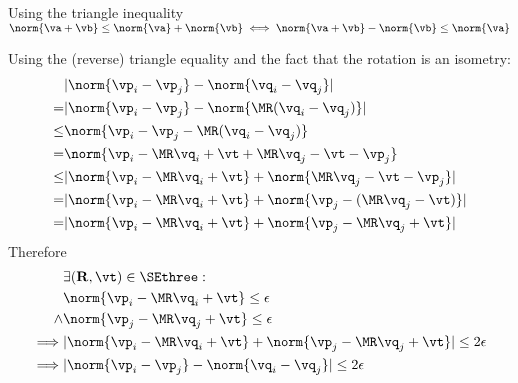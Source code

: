  
    Using the triangle inequality $\norm{\va + \vb} \leq \norm{\va} + \norm{\vb} \iff \norm{\va + \vb} - \norm{\vb} \leq \norm{\va}$
    
    Using the (reverse) triangle equality and the fact that the rotation is an isometry:
    \begin{equation}
		\begin{aligned}
             &| \norm{\vp_i - \vp_j} - \norm{\vq_i - \vq_j} |\\
             =&| \norm{\vp_i - \vp_j} - \norm{\MR(\vq_i - \vq_j)} |\\
             \leq & \norm{ \vp_i - \vp_j - \MR (\vq_i - \vq_j)} \\
             =&\norm{ \vp_i - \MR \vq_i + \vt + \MR \vq_j - \vt - \vp_j} \\
             \leq &| \norm{\vp_i - \MR \vq_i + \vt} + \norm{\MR \vq_j - \vt - \vp_j} |\\
             =  &| \norm{\vp_i - \MR \vq_i + \vt} + \norm{\vp_j - (\MR \vq_j - \vt)} |\\
             =   &| \norm{\vp_i - \MR \vq_i + \vt} + \norm{\vp_j - \MR \vq_j + \vt} |\\
            \end{aligned}
	\end{equation}
 Therefore 
    \begin{equation}
		\begin{aligned}
         &\exists (\mathbf{R}, \vt) \in \SEthree:\\
            &\norm{\vp_i - \MR \vq_i + \vt} \leq \epsilon\\
            \land &\norm{\vp_j - \MR \vq_j + \vt} \leq \epsilon\\
        \implies & | \norm{\vp_i - \MR \vq_i + \vt} + \norm{\vp_j - \MR \vq_j + \vt} | \leq 2 \epsilon \\
        \implies & | \norm{\vp_i - \vp_j} - \norm{\vq_i - \vq_j} | \leq 2 \epsilon \\
            \end{aligned}
	\end{equation}